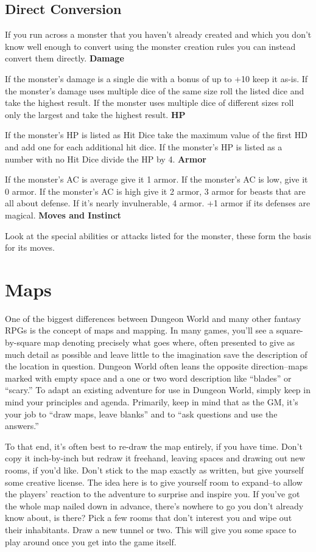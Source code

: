 \subsection{Direct Conversion}


 If you run across a monster that you haven't already created and which you don't know well enough to convert using the monster creation rules you can instead convert them directly.
\textbf{Damage}


 If the monster's damage is a single die with a bonus of up to +10 keep it as-is. If the monster's damage uses multiple dice of the same size roll the listed dice and take the highest result. If the monster uses multiple dice of different sizes roll only the largest and take the highest result.
\textbf{HP}


 If the monster's HP is listed as Hit Dice take the maximum value of the first HD and add one for each additional hit dice. If the monster's HP is listed as a number with no Hit Dice divide the HP by 4.
\textbf{Armor}


 If the monster's AC is average give it 1 armor. If the monster's AC is low, give it 0 armor. If the monster's AC is high give it 2 armor, 3 armor for beasts that are all about defense. If it's nearly invulnerable, 4 armor. +1 armor if its defenses are magical.
\textbf{Moves and Instinct}


 Look at the special abilities or attacks listed for the monster, these form the basis for its moves.
\section*{Maps}


 One of the biggest differences between Dungeon World and many other fantasy RPGs is the concept of maps and mapping. In many games, you'll see a square-by-square map denoting precisely what goes where, often presented to give as much detail as possible and leave little to the imagination save the description of the location in question. Dungeon World often leans the opposite direction--maps marked with empty space and a one or two word description like ``blades'' or ``scary.'' To adapt an existing adventure for use in Dungeon World, simply keep in mind your principles and agenda. Primarily, keep in mind that as the GM, it's your job to ``draw maps, leave blanks'' and to ``ask questions and use the answers.''


 To that end, it's often best to re-draw the map entirely, if you have time. Don't copy it inch-by-inch but redraw it freehand, leaving spaces and drawing out new rooms, if you'd like. Don't stick to the map exactly as written, but give yourself some creative license. The idea here is to give yourself room to expand--to allow the players' reaction to the adventure to surprise and inspire you. If you've got the whole map nailed down in advance, there's nowhere to go you don't already know about, is there? Pick a few rooms that don't interest you and wipe out their inhabitants. Draw a new tunnel or two. This will give you some space to play around once you get into the game itself.


